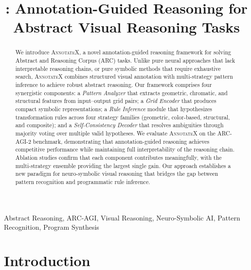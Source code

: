 \documentclass[conference,10pt,letterpaper]{IEEEtran}
\title{\annotatexname: Annotation-Guided Reasoning for\\Abstract Visual Reasoning Tasks}
\author{
\IEEEauthorblockN{Shyam Desigan}
\IEEEauthorblockA{AnnotateX Research Team\\
\texttt{shyam@annotatex.ai}}
}
\date{}
\newcommand{\annotatexname}{\textsc{AnnotateX}}
\begin{document}
\maketitle

\begin{abstract}
We introduce \annotatexname, a novel annotation-guided reasoning framework for solving Abstract and Reasoning Corpus (ARC) tasks. Unlike pure neural approaches that lack interpretable reasoning chains, or pure symbolic methods that require exhaustive search, \annotatexname{} combines structured visual annotation with multi-strategy pattern inference to achieve robust abstract reasoning. Our framework comprises four synergistic components: a \emph{Pattern Analyzer} that extracts geometric, chromatic, and structural features from input--output grid pairs; a \emph{Grid Encoder} that produces compact symbolic representations; a \emph{Rule Inference} module that hypothesizes transformation rules across four strategy families (geometric, color-based, structural, and composite); and a \emph{Self-Consistency Decoder} that resolves ambiguities through majority voting over multiple valid hypotheses. We evaluate \annotatexname{} on the ARC-AGI-2 benchmark, demonstrating that annotation-guided reasoning achieves competitive performance while maintaining full interpretability of the reasoning chain. Ablation studies confirm that each component contributes meaningfully, with the multi-strategy ensemble providing the largest single gain. Our approach establishes a new paradigm for neuro-symbolic visual reasoning that bridges the gap between pattern recognition and programmatic rule inference.
\end{abstract}

\begin{IEEEkeywords}
Abstract Reasoning, ARC-AGI, Visual Reasoning, Neuro-Symbolic AI, Pattern Recognition, Program Synthesis
\end{IEEEkeywords}

\section{Introduction}
\label{sec:introduction}
\end{document}
